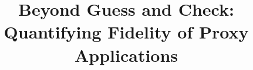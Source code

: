 \documentclass[conference]{IEEEtran}
\newcommand{\commentout}[1]{}
\begin{document}
\title{\Large \bf Beyond Guess and Check: Quantifying Fidelity of Proxy Applications\\

}

\commentout{ %
\author{\IEEEauthorblockN{1\textsuperscript{st} Si Chen}
\IEEEauthorblockA{
\textit{Emory University}\\
Atlanta, GA, USA \\
si.chen2@emory.edu}
\and
\IEEEauthorblockN{2\textsuperscript{nd} Omar Aaziz}
\IEEEauthorblockA{
\textit{Sandia National Laboratories}\\
Albuquerque,New Mexico,USA\\
oaaziz@sandia.gov}
\and
\IEEEauthorblockN{3\textsuperscript{rd} Jeanine Cook}
\IEEEauthorblockA{
\textit{Sandia National Laboratories}\\
Albuquerque,New Mexico,USA\\
jeacook@sandia.gov}
\and
\IEEEauthorblockN{4\textsuperscript{th} Avani Wildani}
\IEEEauthorblockA{
\textit{Emory University}\\
Atlanta, GA, USA\\
avani@mathcs.emory.edu}

}
}%
\maketitle
\end{document}
